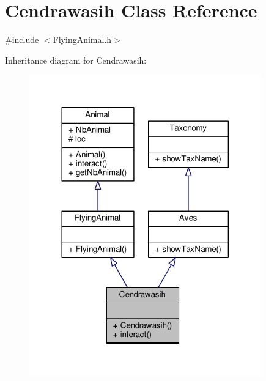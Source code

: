 \hypertarget{classCendrawasih}{}\section{Cendrawasih Class Reference}
\label{classCendrawasih}


{\ttfamily \#include $<$Flying\+Animal.\+h$>$}



Inheritance diagram for Cendrawasih\+:
\nopagebreak
\begin{figure}[H]
\begin{center}
\leavevmode
\includegraphics[width=284pt]{classCendrawasih__inherit__graph}
\end{center}
\end{figure}


